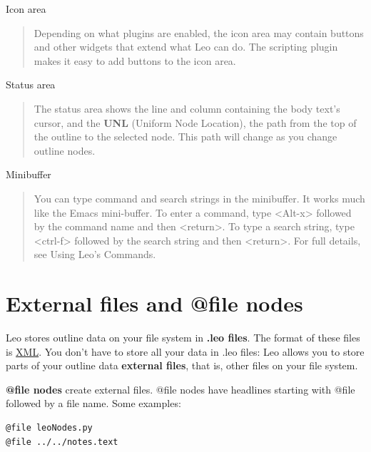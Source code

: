 \documentclass[a4paper,10pt,english]{sphinxmanual}
\begin{document}
Icon area
\begin{quote}

Depending on what plugins are enabled, the icon area may contain
buttons and other widgets that extend what Leo can do. The scripting plugin
makes it easy to add buttons to the icon area.
\end{quote}

Status area
\begin{quote}

The status area shows the line and column containing the body text's cursor,
and the \textbf{UNL} (Uniform Node Location), the path from the top of the outline
to the selected node.  This path will change as you change outline nodes.
\end{quote}

Minibuffer
\begin{quote}

You can type command and search strings in the minibuffer. It works much
like the Emacs mini-buffer. To enter a command, type \textless{}Alt-x\textgreater{} followed by the
command name and then \textless{}return\textgreater{}. To type a search string, type \textless{}ctrl-f\textgreater{}
followed by the search string and then \textless{}return\textgreater{}. For full details, see
Using Leo's Commands.
\end{quote}


\section{External files and @file nodes}
\label{intro:external-files-and-file-nodes}
Leo stores outline data on your file system in \textbf{.leo files}. The format of
these files is \href{http://en.wikipedia.org/wiki/XML}{XML}. You don't have to store all your data in .leo files: Leo
allows you to store parts of your outline data \textbf{external files}, that is,
other files on your file system.

\textbf{@file nodes} create external files. @file nodes have headlines starting with
@file followed by a file name. Some examples:

\begin{Verbatim}[commandchars=\\\{\}]
@file leoNodes.py
@file ../../notes.text
\end{Verbatim}
\end{document}
